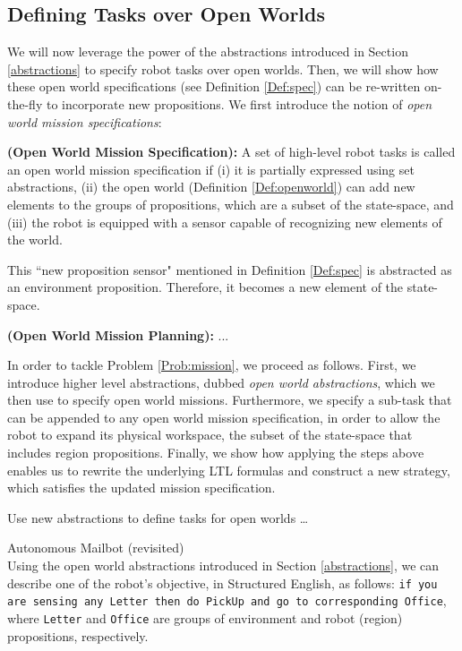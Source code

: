 \subsection{Defining Tasks over Open Worlds}

We will now leverage the power of the abstractions introduced in Section \ref{abstractions} to specify robot tasks over open worlds. Then, we will show how these open world specifications (see Definition \ref{Def:spec}) can be re-written on-the-fly to incorporate new propositions. We first introduce the notion of \emph{open world mission specifications}:

\begin{myDefinition}\label{Def:spec}
	\textbf{(Open World Mission Specification):} A set of high-level robot tasks is called an open world mission specification if (i) it is partially expressed using set abstractions, (ii) the open world (Definition \ref{Def:openworld}) can add new elements to the groups of propositions, which are a subset of the state-space, and (iii) the robot is equipped with a sensor capable of recognizing new elements of the world. 
	\end{myDefinition} 
This ``new proposition sensor" mentioned in Definition \ref{Def:spec} is abstracted as an environment proposition. Therefore, it becomes a new element of the state-space.

\begin{myProblem}\label{Prob:mission}
	\textbf{(Open World Mission Planning):}
	...
\end{myProblem}

In order to tackle Problem \ref{Prob:mission}, we proceed as follows. First, we introduce higher level abstractions, dubbed \emph{open world abstractions}, %
which we then use to specify open world missions. Furthermore, we specify a sub-task that can be appended to any open world mission specification, in order to allow the robot to expand its physical workspace, the subset of the state-space that includes region propositions. Finally, we  show how applying the steps above enables us to rewrite the underlying LTL formulas and construct a new strategy, which satisfies the updated mission specification. 

Use new abstractions to define tasks for open worlds \ldots

\begin{myExample}\label{Ex:mailbot2} Autonomous Mailbot (revisited)\\
	Using the open world abstractions introduced in Section \ref{abstractions}, we can describe one of the robot's objective, in Structured English, as follows: 
\texttt{if you are sensing any Letter then do PickUp and go to corresponding Office}, where \texttt{Letter} and \texttt{Office} are groups of environment and robot (region) propositions, respectively.
\end{myExample}

